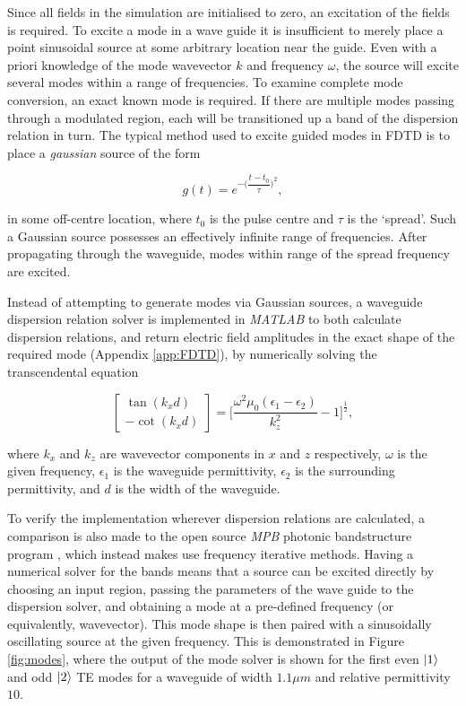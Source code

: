 Since all fields in the simulation are initialised to zero, an excitation of the fields is required. To excite a mode in a wave guide it is insufficient to merely place a point sinusoidal source at some arbitrary location near the guide. Even with a priori knowledge of the mode wavevector $k$ and frequency $\omega$, the source will excite several modes within a range of frequencies. To examine complete mode conversion, an exact known mode is required. If there are multiple modes passing through a modulated region, each will be transitioned up a band of the dispersion relation in turn. The typical method used to excite guided modes in FDTD is to place a \textit{gaussian} source of the form

\begin{equation}
g(t) = e^{-\Big(\dfrac{t-t_0}{\tau}\Big)^2},
\end{equation}

in some off-centre location, where $t_0$ is the pulse centre and $\tau$ is the `spread'. Such a Gaussian source possesses an effectively infinite range of frequencies. After propagating through the waveguide, modes within range of the spread frequency are excited.

Instead of attempting to generate modes via Gaussian sources, a waveguide dispersion relation solver is implemented in \textit{MATLAB} to both calculate dispersion relations, and return electric field amplitudes in the exact shape of the required mode (Appendix \ref{app:FDTD}), by numerically solving the transcendental equation \cite{Rana2017}

\begin{equation}
\begin{bmatrix}
\tan(k_x d) \\
- \cot(k_x d )
\end{bmatrix}
=
\Big[\dfrac{\omega^2 \mu_0 (\epsilon_1 - \epsilon_2)}{k_z^2}-1\Big]^{\frac{1}{2}},
\end{equation}

where $k_x$ and $k_z$ are wavevector components in $x$ and $z$ respectively, $\omega$ is the given frequency, $\epsilon_1$ is the waveguide permittivity, $\epsilon_2$ is the surrounding permittivity, and $d$ is the width of the waveguide.

To verify the implementation wherever dispersion relations are calculated, a comparison is also made to the open source \textit{MPB} photonic bandstructure program \cite{Johnson2001}, which instead makes use frequency iterative methods. Having a numerical solver for the bands means that a source can be excited directly by choosing an input region, passing the parameters of the wave guide to the dispersion solver, and obtaining a mode at a pre-defined frequency (or equivalently, wavevector). This mode shape is then paired with a sinusoidally oscillating source at the given frequency. This is demonstrated in Figure \ref{fig:modes}, where the output of the mode solver is shown for the first even $\ket{1}$ and odd $\ket{2}$ TE modes for a waveguide of width $1.1 \mu m$ and relative permittivity $10$. 


